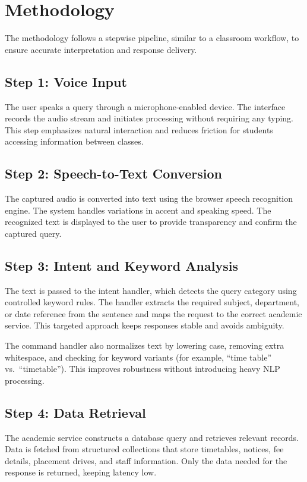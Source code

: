 ﻿\documentclass[conference]{IEEEtran}
\begin{document}
\section{Methodology}
The methodology follows a stepwise pipeline, similar to a classroom workflow, to ensure accurate interpretation and response delivery.

\subsection{Step 1: Voice Input}
The user speaks a query through a microphone-enabled device. The interface records the audio stream and initiates processing without requiring any typing. This step emphasizes natural interaction and reduces friction for students accessing information between classes.

\subsection{Step 2: Speech-to-Text Conversion}
The captured audio is converted into text using the browser speech recognition engine. The system handles variations in accent and speaking speed. The recognized text is displayed to the user to provide transparency and confirm the captured query.

\subsection{Step 3: Intent and Keyword Analysis}
The text is passed to the intent handler, which detects the query category using controlled keyword rules. The handler extracts the required subject, department, or date reference from the sentence and maps the request to the correct academic service. This targeted approach keeps responses stable and avoids ambiguity.

The command handler also normalizes text by lowering case, removing extra whitespace, and checking for keyword variants (for example, ``time table'' vs.\ ``timetable''). This improves robustness without introducing heavy NLP processing.

\subsection{Step 4: Data Retrieval}
The academic service constructs a database query and retrieves relevant records. Data is fetched from structured collections that store timetables, notices, fee details, placement drives, and staff information. Only the data needed for the response is returned, keeping latency low.
\end{document}
